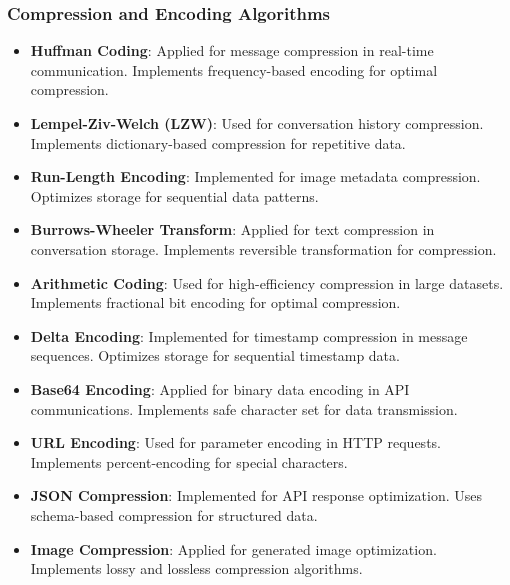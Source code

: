 \documentclass[conference]{IEEEtran}
\begin{document}
\subsubsection{Compression and Encoding Algorithms}
\begin{itemize}
\item \textbf{Huffman Coding}: Applied for message compression in real-time communication. Implements frequency-based encoding for optimal compression.
\item \textbf{Lempel-Ziv-Welch (LZW)}: Used for conversation history compression. Implements dictionary-based compression for repetitive data.
\item \textbf{Run-Length Encoding}: Implemented for image metadata compression. Optimizes storage for sequential data patterns.
\item \textbf{Burrows-Wheeler Transform}: Applied for text compression in conversation storage. Implements reversible transformation for compression.
\item \textbf{Arithmetic Coding}: Used for high-efficiency compression in large datasets. Implements fractional bit encoding for optimal compression.
\item \textbf{Delta Encoding}: Implemented for timestamp compression in message sequences. Optimizes storage for sequential timestamp data.
\item \textbf{Base64 Encoding}: Applied for binary data encoding in API communications. Implements safe character set for data transmission.
\item \textbf{URL Encoding}: Used for parameter encoding in HTTP requests. Implements percent-encoding for special characters.
\item \textbf{JSON Compression}: Implemented for API response optimization. Uses schema-based compression for structured data.
\item \textbf{Image Compression}: Applied for generated image optimization. Implements lossy and lossless compression algorithms.
\end{itemize}
\end{document}
